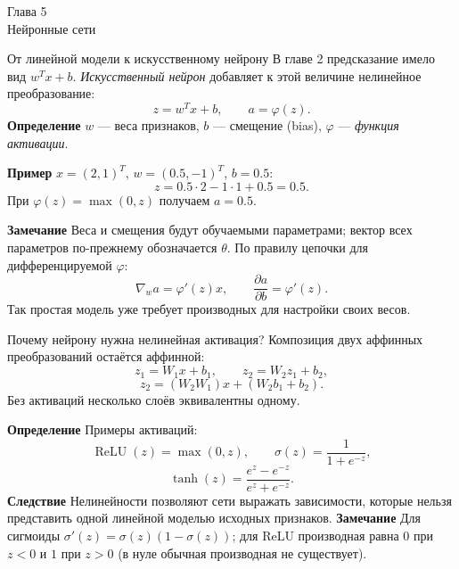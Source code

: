 \documentclass[10pt]{beamer}
\newcommand{\dblue}[1]{\textcolor{defblue}{#1}}
\newcommand{\chapterframe}[2]{%
    \begin{frame}
        \vfill
        \begin{center}
            {\Large \dblue{Глава #1}}\\[0.65em]
            {\LARGE #2}
        \end{center}
        \vfill
    \end{frame}
}
\newcommand{\mlBody}{\normalsize}
\newcommand{\mlDefinition}{\textcolor{defblue}{\bfseries Определение}}
\newcommand{\mlRemark}{\textcolor{defblue}{\bfseries Замечание}}
\newcommand{\mlConsequence}{\textcolor{defblue}{\bfseries Следствие}}
\newcommand{\mlExample}{\textcolor{defblue}{\bfseries Пример}}
\begin{document}
\chapterframe{5}{Нейронные сети}

\begin{frame}{От линейной модели к искусственному нейрону}
\mlBody
В главе 2 предсказание имело вид $w^Tx+b$. \textit{Искусственный нейрон} добавляет к этой величине нелинейное преобразование:
\[
 \boxed{z=w^Tx+b,\qquad a=\varphi(z)}.
\]
\mlDefinition\; $w$ --- веса признаков, $b$ --- смещение (bias), $\varphi$ --- \textit{функция активации}.

\mlExample\; $x=(2,1)^T$, $w=(0.5,-1)^T$, $b=0.5$:
\[
 z=0.5\cdot2-1\cdot1+0.5=0.5.
\]
При $\varphi(z)=\max(0,z)$ получаем $a=0.5$.

\mlRemark\; Веса и смещения будут обучаемыми параметрами;
вектор всех параметров по-прежнему обозначается $\theta$.
По правилу цепочки для дифференцируемой $\varphi$:
\[
   \nabla_w a=\varphi'(z)x,\qquad \frac{\partial a}{\partial b}=\varphi'(z).
\]
Так простая модель уже требует производных для настройки своих весов.
\end{frame}

\begin{frame}{Почему нейрону нужна нелинейная активация?}
\mlBody
Композиция двух аффинных преобразований остаётся аффинной:
\[
 z_1=W_1x+b_1,\qquad z_2=W_2z_1+b_2,
\]
\[
 z_2=(W_2W_1)x+(W_2b_1+b_2).
\]
Без активаций несколько слоёв эквивалентны одному.

\mlDefinition\; Примеры активаций:
\[
 \operatorname{ReLU}(z)=\max(0,z),\qquad
 \sigma(z)=\frac1{1+e^{-z}},
\]
\[
 \tanh(z)=\frac{e^z-e^{-z}}{e^z+e^{-z}}.
\]
\mlConsequence\; Нелинейности позволяют сети выражать зависимости,
которые нельзя представить одной линейной моделью исходных признаков.
\mlRemark\; Для сигмоиды $\sigma'(z)=\sigma(z)(1-\sigma(z))$;
для ReLU производная равна $0$ при $z<0$ и $1$ при $z>0$
(в нуле обычная производная не существует).
\end{frame}
\end{document}
